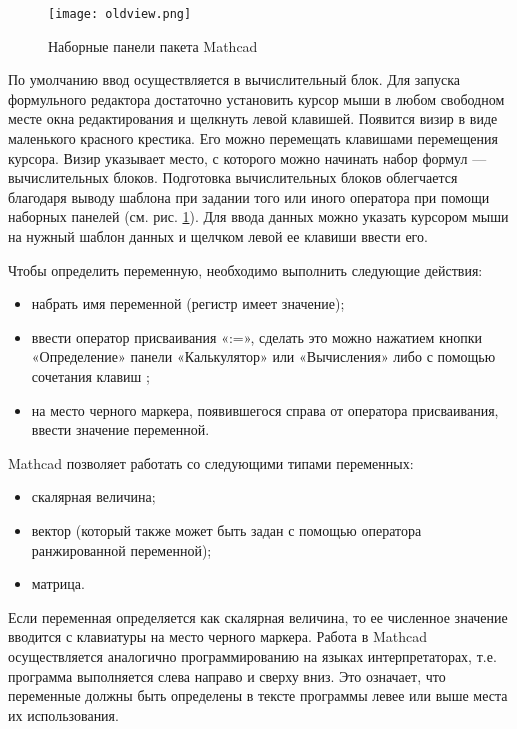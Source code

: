 \begin{figure}[h]
	\begin{center}
		\texttt{[image: oldview.png]}
	\end{center}
	\caption{Наборные панели пакета Mathcad} \label{fig:oldmathcad.view}
\end{figure}

По умолчанию ввод осуществляется в вычислительный блок. Для запуска формульного редактора достаточно установить курсор мыши в любом свободном месте окна редактирования и щелкнуть левой клавишей. Появится визир в виде маленького красного крестика. Его можно перемещать клавишами перемещения курсора. Визир указывает место, с которого можно начинать набор формул --- вычислительных блоков. Подготовка вычислительных блоков облегчается благодаря выводу шаблона при задании того или иного оператора при помощи наборных панелей (см. рис. \ref{fig:oldmathcad.view}). Для ввода данных можно указать курсором мыши на нужный шаблон данных и щелчком левой ее клавиши ввести его.

Чтобы определить переменную, необходимо выполнить следующие действия:
\begin{itemize}
	\item набрать имя переменной (регистр имеет значение);
	\item ввести оператор присваивания «:=», сделать это можно нажатием кнопки «Определение» панели «Калькулятор» или «Вычисления» либо с помощью сочетания клавиш \keys{\shift+:};
	\item на место черного маркера, появившегося справа от оператора присваивания, ввести значение переменной.
\end{itemize}
Mathcad позволяет работать со следующими типами переменных:
\begin{itemize}
\item скалярная величина;
\item вектор (который также может быть задан с помощью оператора ранжированной переменной);
\item матрица.
\end{itemize}

Если переменная определяется как скалярная величина, то ее численное значение вводится с клавиатуры на место черного маркера. Работа в Mathcad осуществляется аналогично программированию на языках интерпретаторах, т.е. программа выполняется слева направо и сверху вниз. Это означает, что переменные должны быть определены в тексте программы левее или выше места их использования.

